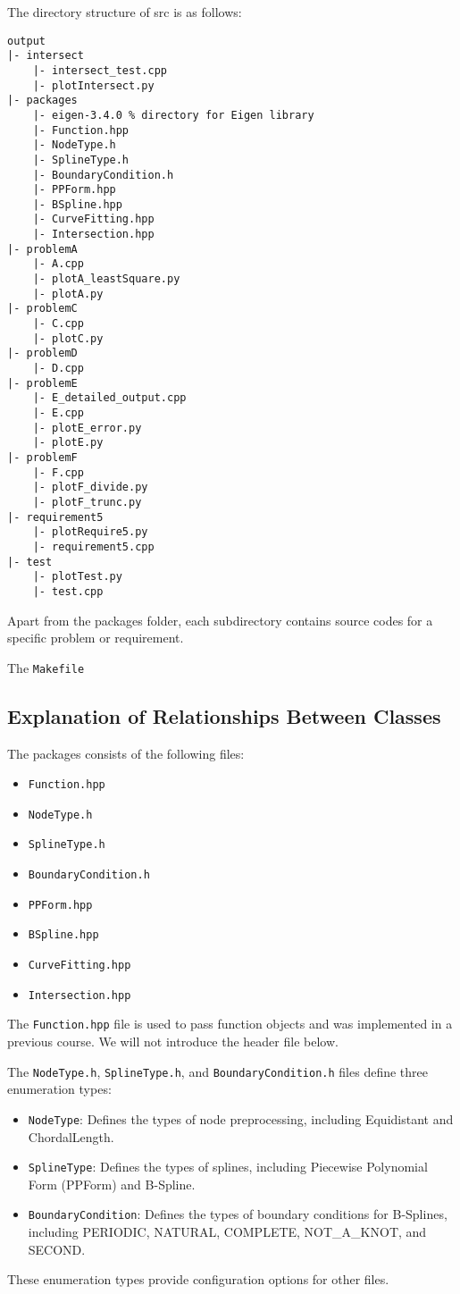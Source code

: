 \documentclass[a4paper]{article}
\begin{document}
\begin{sloppypar}
The directory structure of src is as follows:
\begin{lstlisting}
output
|- intersect
    |- intersect_test.cpp
    |- plotIntersect.py
|- packages 
    |- eigen-3.4.0 % directory for Eigen library
    |- Function.hpp
    |- NodeType.h
    |- SplineType.h
    |- BoundaryCondition.h
    |- PPForm.hpp
    |- BSpline.hpp
    |- CurveFitting.hpp
    |- Intersection.hpp
|- problemA
    |- A.cpp
    |- plotA_leastSquare.py
    |- plotA.py
|- problemC
    |- C.cpp
    |- plotC.py
|- problemD
    |- D.cpp
|- problemE
    |- E_detailed_output.cpp
    |- E.cpp
    |- plotE_error.py
    |- plotE.py
|- problemF
    |- F.cpp
    |- plotF_divide.py
    |- plotF_trunc.py
|- requirement5
    |- plotRequire5.py
    |- requirement5.cpp
|- test
    |- plotTest.py
    |- test.cpp
\end{lstlisting}

Apart from the packages folder, each subdirectory contains source codes for a
specific problem or requirement.

The \verb|Makefile|

\subsection{Explanation of Relationships Between Classes}
The packages consists of the following files:
\begin{itemize}
  \item \texttt{Function.hpp}
  \item \texttt{NodeType.h}
  \item \texttt{SplineType.h}
  \item \texttt{BoundaryCondition.h}
  \item \texttt{PPForm.hpp}
  \item \texttt{BSpline.hpp}
  \item \texttt{CurveFitting.hpp}
  \item \texttt{Intersection.hpp}
\end{itemize}

The \verb|Function.hpp| file is used to pass function objects and was
implemented in a previous course. We will not introduce the header file below.

The \verb|NodeType.h|, \verb|SplineType.h|, and \verb|BoundaryCondition.h|
files define three enumeration types:
\begin{itemize}
  \item \verb|NodeType|: Defines the types of node preprocessing, including Equidistant and ChordalLength.
  \item \verb|SplineType|: Defines the types of splines, including Piecewise Polynomial Form (PPForm) and B-Spline.
  \item \verb|BoundaryCondition|: Defines the types of boundary conditions for B-Splines, including PERIODIC, NATURAL, COMPLETE, NOT\_A\_KNOT, and SECOND.
\end{itemize}
These enumeration types provide configuration options for other files.


\end{sloppypar}
\end{document}
